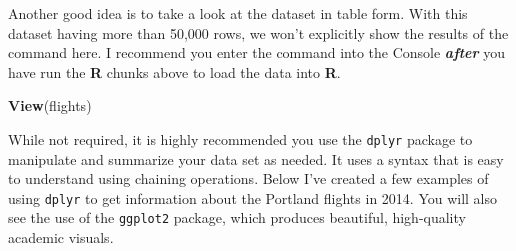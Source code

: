 \documentclass[12pt, twoside]{amherstthesis}
\newenvironment{Shaded}{\begin{snugshade}}{\end{snugshade}}
\newcommand{\KeywordTok}[1]{\textcolor[rgb]{0.13,0.29,0.53}{\textbf{#1}}}
\newcommand{\NormalTok}[1]{#1}
\theoremstyle{definition}
\theoremstyle{definition}
\theoremstyle{definition}
\theoremstyle{remark}
\begin{document}
Another good idea is to take a look at the dataset in table form. With this dataset having more than 50,000 rows, we won't explicitly show the results of the command here. I recommend you enter the command into the Console \textbf{\emph{after}} you have run the \textbf{R} chunks above to load the data into \textbf{R}.
\begin{Shaded}
\begin{Highlighting}[]
\KeywordTok{View}\NormalTok{(flights)}
\end{Highlighting}
\end{Shaded}
While not required, it is highly recommended you use the \texttt{dplyr} package to manipulate and summarize your data set as needed. It uses a syntax that is easy to understand using chaining operations. Below I've created a few examples of using \texttt{dplyr} to get information about the Portland flights in 2014. You will also see the use of the \texttt{ggplot2} package, which produces beautiful, high-quality academic visuals.
\end{document}
